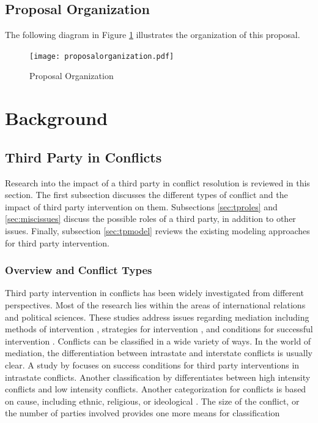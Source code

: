 \documentclass[letterpaper,12pt,titlepage,oneside,final]{book}
\begin{document}
\section{Proposal Organization}

The following diagram in Figure \ref{fig:proposal} illustrates the organization of this proposal.

\begin{center}
\begin{figure}[h!]
\centering
\texttt{[image: proposalorganization.pdf]}

\caption{Proposal Organization}

\label{fig:proposal}
\end{figure}
\end{center}





\chapter{Background}




\section{Third Party in Conflicts}

Research into the impact of a third party in conflict resolution is reviewed in this section. The first subsection discusses the different types of conflict and the impact of third party intervention on them. Subsections \ref{sec:tproles} and \ref{sec:miscissues} discuss the possible roles of a third party, in addition to other issues. Finally, subsection \ref{sec:tpmodel} reviews the existing modeling approaches for third party intervention.

\subsection{Overview and Conflict Types}
\label{sec:ovrct}
Third party intervention in conflicts has been widely investigated from different perspectives. Most of the research lies within the areas of international relations and political sciences. These studies address  issues regarding mediation including methods of intervention \citep{fisher2001}, strategies for intervention \citep{prein1987}, and conditions for successful intervention \citep{regan1996}. 
Conflicts can be classified in a wide variety of ways. In the world of mediation, the differentiation between intrastate and interstate conflicts is usually clear. A study by \citet{regan1996} focuses on success conditions for third party interventions in intrastate conflicts. Another classification by \citet{bercovitch2006} differentiates between high intensity conflicts and low intensity conflicts. Another categorization for conflicts is based on cause, including ethnic, religious, or ideological \citep{regan1996}.  The size of the conflict, or the number of parties involved provides one more means for classification \citep{jehn1997}
\end{document}
